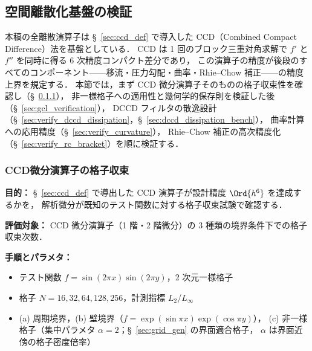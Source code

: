 %
\subsection{空間離散化基盤の検証}
\label{sec:verify_spatial}

本稿の全離散演算子は §~\ref{sec:ccd_def} で導入した CCD（Combined Compact Difference）法を基盤としている．
CCD は 1 回のブロック三重対角求解で $f'$ と $f''$ を同時に得る 6 次精度コンパクト差分であり，
この演算子の精度が後段のすべてのコンポーネント——移流・圧力勾配・曲率・Rhie--Chow 補正——の精度上界を規定する．
本節では，まず CCD 微分演算子そのものの格子収束性を確認し（§~\ref{sec:verify_ccd_convergence}），
非一様格子への適用性と幾何学的保存則を検証した後（§~\ref{sec:gcl_verification}），
DCCD フィルタの散逸設計（§~\ref{sec:verify_dccd_dissipation}，§~\ref{sec:dccd_dissipation_bench}），
曲率計算への応用精度（§~\ref{sec:verify_curvature}），
Rhie--Chow 補正の高次精度化（§~\ref{sec:verify_rc_bracket}）を順に検証する．

\subsubsection{CCD微分演算子の格子収束}
\label{sec:verify_ccd_convergence}

\noindent\textbf{目的：}
§~\ref{sec:ccd_def} で導出した CCD 演算子が設計精度 $\Ord{h^6}$ を達成するかを，
解析微分が既知のテスト関数に対する格子収束試験で確認する．

\noindent\textbf{評価対象：}
CCD 微分演算子（1 階・2 階微分）の 3 種類の境界条件下での格子収束次数．

\noindent\textbf{手順とパラメタ：}
\begin{itemize}[noitemsep]
  \item テスト関数 $f = \sin(2\pi x)\sin(2\pi y)$，2 次元一様格子
  \item 格子 $N = 16, 32, 64, 128, 256$，計測指標 $L_2$/$L_\infty$
  \item (a) 周期境界，(b) 壁境界（$f = \exp(\sin\pi x)\exp(\cos\pi y)$），
        (c) 非一様格子（集中パラメタ $\alpha=2$；§~\ref{sec:grid_gen} の界面適合格子，
            $\alpha$ は界面近傍の格子密度倍率）
\end{itemize}

